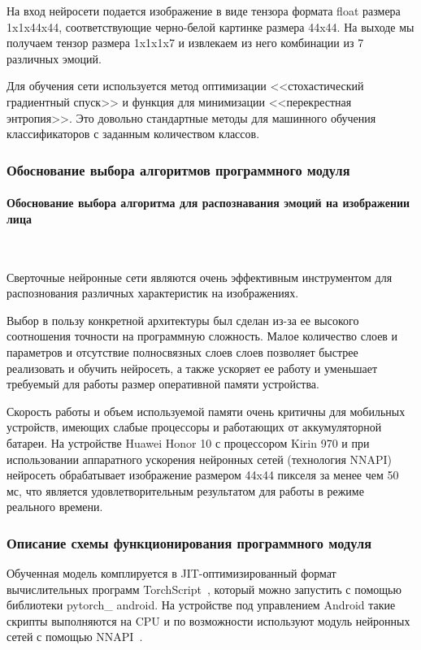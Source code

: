 \documentclass[a4paper,12pt]{article}
\begin{document}
    На вход нейросети подается изображение в виде тензора формата float размера 1x1x44x44, соответствующие черно-белой картинке размера 44x44.
    На выходе мы получаем тензор размера 1x1x1x7 и извлекаем из него комбинации из 7 различных эмоций.

    Для обучения сети используется метод оптимизации <<стохастический градиентный спуск>> и функция для минимизации <<перекрестная энтропия>>.
    Это довольно стандартные методы для машинного обучения классификаторов с заданным количеством классов.

    \subsubsection{Обоснование выбора алгоритмов программного модуля}

    \paragraph{Обоснование выбора алгоритма для распознавания эмоций на изображении лица}
    \ \vspace{.5em}

    Сверточные нейронные сети являются очень эффективным инструментом для распознования различных характеристик на изображениях.

    Выбор в пользу конкретной архитектуры был сделан из-за ее высокого соотношения точности на программную сложность.
    Малое количество слоев и параметров и отсутствие полносвязных слоев слоев позволяет быстрее реализовать и обучить нейросеть,
    а также ускоряет ее работу и уменьшает требуемый для работы размер оперативной памяти устройства.

    Скорость работы и объем используемой памяти очень критичны для мобильных устройств, имеющих слабые процессоры и работающих от аккумуляторной батареи.
    На устройстве Huawei Honor 10 с процессором Kirin 970 и при использовании аппаратного ускорения нейронных сетей (технология NNAPI) нейросеть обрабатывает
    изображение размером 44x44 пикселя за менее чем 50 мс, что является удовлетворительным результатом для работы в режиме реального времени.

    \subsubsection{Описание схемы функционирования программного модуля}

    Обученная модель комплируется в JIT-оптимизированный формат вычислительных программ TorchScript~\cite{torchscript}, который можно запустить с помощью библиотеки pytorch\_ android.
    На устройстве под управлением Android такие скрипты выполняются на CPU и по возможности используют модуль нейронных сетей с помощью NNAPI~\cite{nnapi}.
\end{document}
